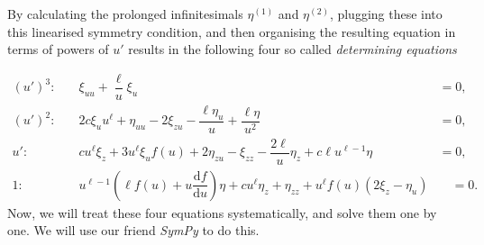 By calculating the prolonged infinitesimals $\eta^{(1)}$ and $\eta^{(2)}$, plugging these into this linearised symmetry condition, and then organising the resulting equation in terms of powers of $u'$ results in the following four so called \textit{determining equations}

\begin{align}
(u')^3:&\quad\xi_{uu}+\dfrac{\ell}{u}\xi_u&=0,\label{eq:det_eq_1}\\
(u')^2:&\quad2c\xi_u u^{\ell}+\eta_{uu}-2\xi_{zu}-\dfrac{\ell\eta_u}{u}+\dfrac{\ell\eta}{u^2}&=0,\label{eq:det_eq_2}\\
u':&\quad cu^{\ell}\xi_z+3u^{\ell}\xi_u f(u)+2\eta_{zu}-\xi_{zz}-\dfrac{2\ell}{u}\eta_z+c\ell u^{\ell-1}\eta&=0,\label{eq:det_eq_3}\\
1:&\quad u^{\ell-1}\left(\ell f(u)+u\dfrac{\mathrm{d}f}{\mathrm{d}u}\right)\eta+cu^{\ell}\eta_z+\eta_{zz}+u^{\ell}f(u)(2\xi_z-\eta_u)&\quad=0.\label{eq:det_eq_4}
\end{align}
Now, we will treat these four equations systematically, and solve them one by one. We will use our friend \textit{SymPy} to do this.
